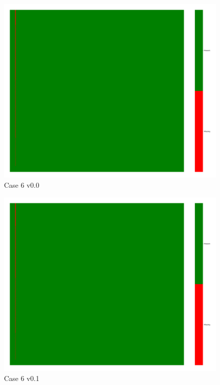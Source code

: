 \documentclass[a4paper,12pt]{article}
\begin{document}
\begin{figure}[H]
    \includegraphics[width=\linewidth]{case6_v0.0_heatmap_cleaned.png}
    \caption*{Case 6 v0.0}
\end{figure}

\begin{figure}[H]
    \includegraphics[width=\linewidth]{case6_v0.1_heatmap_cleaned.png}
    \caption*{Case 6 v0.1}
\end{figure}
\end{document}
